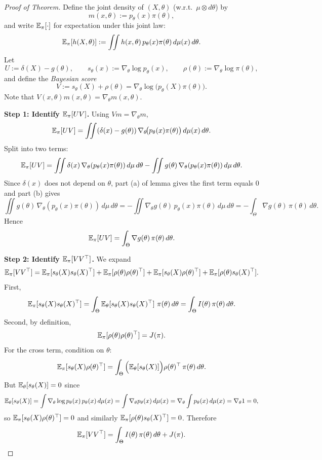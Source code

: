 \begin{proof}[Proof of Theorem]
Define the joint density of $(X,\theta)$ (w.r.t.\ $\mu\otimes d\theta$) by
\[
m(x,\theta) := p_\theta(x)\pi(\theta),
\]
and write $\mathbb{E}_\pi[\cdot]$ for expectation under this joint law:
\[
\mathbb{E}_\pi[h(X,\theta)] := \iint h(x,\theta)\,p_\theta(x)\pi(\theta)\,d\mu(x)\,d\theta.
\]
Let
\[
U := \delta(X)-g(\theta),\qquad
s_\theta(x):=\nabla_\theta\log p_\theta(x),\qquad
\rho(\theta):=\nabla_\theta\log\pi(\theta),
\]
and define the \emph{Bayesian score}
\[
V := s_\theta(X)+\rho(\theta)=\nabla_\theta\log\big(p_\theta(X)\pi(\theta)\big).
\]
Note that $V(x,\theta)m(x,\theta) = \nabla_\theta m(x,\theta)$.

\textbf{Step 1: Identify $\mathbb{E}_\pi[UV]$.}
Using $V m=\nabla_\theta m$,
\[
\mathbb{E}_\pi[U V]
= \iint (\delta(x)-g(\theta))\,\nabla_\theta\!\big(p_\theta(x)\pi(\theta)\big)\,d\mu(x)\,d\theta.
\]
Split into two terms:
\[
\mathbb{E}_\pi[UV]
= \iint \delta(x)\,\nabla_\theta(p_\theta(x)\pi(\theta))\,d\mu\,d\theta
- \iint g(\theta)\,\nabla_\theta(p_\theta(x)\pi(\theta))\,d\mu\,d\theta.
\]
Since $\delta(x)$ does not depend on $\theta$, part (a) of lemma gives the first term equals $0$ and part (b) gives
\[
\iint g(\theta)\,\nabla_\theta(p_\theta(x)\pi(\theta))\,d\mu\,d\theta
= - \iint \nabla_\theta g(\theta)\,p_\theta(x)\pi(\theta)\,d\mu\,d\theta
= -\int_\Theta \nabla g(\theta)\,\pi(\theta)\,d\theta.
\]
Hence
\begin{equation}\label{eq:UV}
\mathbb{E}_\pi[UV] = \int_\Theta \nabla g(\theta)\,\pi(\theta)\,d\theta.
\end{equation}

\textbf{Step 2: Identify $\mathbb{E}_\pi[VV^\top]$.} We expand
\[
\mathbb{E}_\pi[VV^\top]
=\mathbb{E}_\pi[s_\theta(X)s_\theta(X)^\top] + \mathbb{E}_\pi[\rho(\theta)\rho(\theta)^\top]
+ \mathbb{E}_\pi[s_\theta(X)\rho(\theta)^\top] + \mathbb{E}_\pi[\rho(\theta)s_\theta(X)^\top].
\]
First,
\[
\E_\pi[s_\theta(X)s_\theta(X)^\top]
= \int_\Theta \E_\theta[s_\theta(X)s_\theta(X)^\top]\ \pi(\theta)\,d\theta
= \int_\Theta I(\theta)\,\pi(\theta)\,d\theta.
\]
Second, by definition,
\[
\mathbb{E}_\pi[\rho(\theta)\rho(\theta)^\top] = J(\pi).
\]
For the cross term, condition on $\theta$:
\[
\mathbb{E}_\pi[s_\theta(X)\rho(\theta)^\top]
= \int_\Theta \Big(\mathbb{E}_\theta[s_\theta(X)]\Big)\rho(\theta)^\top\,\pi(\theta)\,d\theta.
\]
But $\mathbb{E}_\theta[s_\theta(X)]=0$ since
\[
\mathbb{E}_\theta[s_\theta(X)]
=\int \nabla_\theta\log p_\theta(x)\,p_\theta(x)\,d\mu(x)
=\int \nabla_\theta p_\theta(x)\,d\mu(x)
=\nabla_\theta \int p_\theta(x)\,d\mu(x)
=\nabla_\theta 1 = 0,
\]
so $\mathbb{E}_\pi[s_\theta(X)\rho(\theta)^\top]=0$ and similarly $\mathbb{E}_\pi[\rho(\theta)s_\theta(X)^\top]=0$. Therefore
\begin{equation}\label{eq:VV}
\mathbb{E}_\pi[VV^\top] = \int_\Theta I(\theta)\,\pi(\theta)\,d\theta + J(\pi).
\end{equation}


\end{proof}
